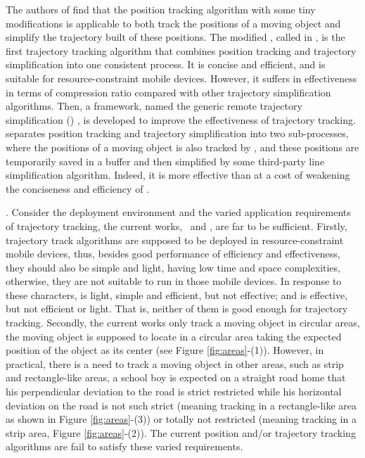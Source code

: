 The authors of \cite{Trajcevski:LDRH} find that the position tracking algorithm \ldr with some tiny modifications is applicable to both track the positions of a moving object and simplify the trajectory built of these positions. The modified \ldr,  called \ldrh in \cite{Lange:Tracking}, is the first trajectory tracking algorithm that combines position tracking and trajectory simplification into one consistent process. It is concise and efficient, and is suitable for resource-constraint mobile devices. However, it suffers in effectiveness in terms of compression ratio compared with other trajectory simplification algorithms.%
%
Then, a framework, named the generic remote trajectory simplification (\grts) \cite{Lange:GRTS,Lange:Tracking}, is developed to improve the effectiveness of trajectory tracking. \grts separates position tracking and trajectory simplification into two sub-processes, where the positions of a moving object is also tracked by \ldr, and these positions are temporarily saved in a buffer and then simplified by some third-party line simplification algorithm. Indeed, it is more effective than \ldrh at a cost of weakening the conciseness and efficiency of \ldrh.
%



. Consider the deployment environment and the varied application requirements of trajectory tracking, the current works, \ie~\ldrh and \grts, are far to be sufficient. Firstly, trajectory track algorithms are supposed to be deployed in resource-constraint mobile devices, thus, besides good performance of efficiency and effectiveness, they should also be simple and light, \ie having low time and space complexities, otherwise, they are not suitable to run in those mobile devices. In response to these characters, \ldrh is light, simple and efficient, but not effective; and \grts is effective, but not efficient or light. That is, neither of them is good enough for trajectory tracking.
%
Secondly, the current works only track a moving object in circular areas, \ie the moving object is supposed to locate in a circular area taking the expected position of the object as its center (see Figure \ref{fig:areas}-(1)). However, in practical, there is a need to track a moving object in other areas, such as strip and rectangle-like areas, \eg a school boy is expected on a straight road home that his perpendicular deviation to the road is strict restricted while his horizontal deviation on the road is not such strict (meaning tracking in a rectangle-like area as shown in Figure \ref{fig:areas}-(3)) or totally not restricted (meaning tracking in a strip area, Figure \ref{fig:areas}-(2)). The current position and/or trajectory tracking algorithms are fail to satisfy these varied requirements.



